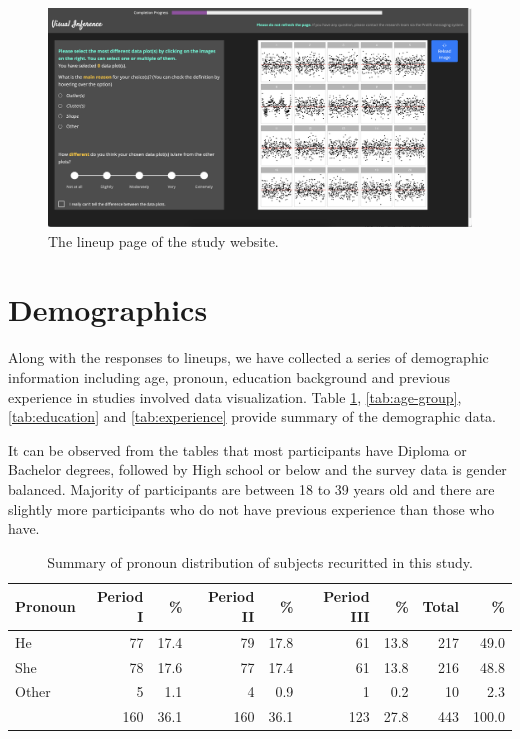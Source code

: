 \documentclass[]{interact}
\theoremstyle{plain}%
\theoremstyle{definition}
\theoremstyle{remark}
\begin{document}
\begin{figure}

{\centering \includegraphics[width=1\linewidth]{figures/lineup1} 

}

\caption{The lineup page of the study website.}\label{fig:lineup-page}
\end{figure}

\hypertarget{demographics}{%
\section{Demographics}\label{demographics}}

Along with the responses to lineups, we have collected a series of
demographic information including age, pronoun, education background and
previous experience in studies involved data visualization. Table
\ref{tab:pronoun}, \ref{tab:age-group}, \ref{tab:education} and
\ref{tab:experience} provide summary of the demographic data.

It can be observed from the tables that most participants have Diploma
or Bachelor degrees, followed by High school or below and the survey
data is gender balanced. Majority of participants are between 18 to 39
years old and there are slightly more participants who do not have
previous experience than those who have.

\begin{table}

\caption{\label{tab:pronoun}Summary of pronoun distribution of subjects recuritted in this study.}
\centering
\begin{tabular}[t]{lrrrrrrrr}
\toprule
Pronoun & Period I & \% & Period II & \% & Period III & \% & Total & \%\\
\midrule
He & 77 & 17.4 & 79 & 17.8 & 61 & 13.8 & 217 & 49.0\\
She & 78 & 17.6 & 77 & 17.4 & 61 & 13.8 & 216 & 48.8\\
Other & 5 & 1.1 & 4 & 0.9 & 1 & 0.2 & 10 & 2.3\\
 & 160 & 36.1 & 160 & 36.1 & 123 & 27.8 & 443 & 100.0\\
\bottomrule
\end{tabular}
\end{table}
\end{document}
